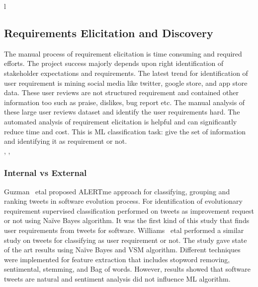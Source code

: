 l\subsection{Requirements Elicitation and Discovery}
The manual process of requirement elicitation is time consuming and required efforts. The project success majorly depends upon right identification of stakeholder expectations and requirements. The latest trend for identification of user requirement is mining social media like twitter, google store, and app store data. These user reviews are not structured requirement and contained other information too such as praise, dislikes, bug report etc. The manual analysis of these large user reviews dataset and identify the user requirements hard. The automated analysis of requirement elicitation is helpful and can significantly reduce time and cost. This is ML classification task: give the set of information and identifying it as requirement or not.\\





\cite{Cleland-Huang:2008}, \cite{Kaiya:2010}, \cite{Castro-Herrera:2009}
\subsubsection{Internal vs External}
Guzman ~etal \cite{Guzman:2017} proposed ALERTme approach for classifying, grouping and ranking tweets in software evolution process. For identification of evolutionary requirement supervised classification performed on tweets as improvement request or not using Naïve Bayes algorithm. It was the first kind of this study that finds user requirements from tweets for software. Williams ~etal \cite{Williams:2017} performed a similar study on tweets for classifying as user requirement or not. The study gave state of the art results using Naïve Bayes and VSM algorithm. Different techniques were implemented for feature extraction that includes stopword removing, sentimental, stemming, and Bag of words. However, results showed that software tweets are natural and sentiment analysis did not influence ML algorithm.\\


